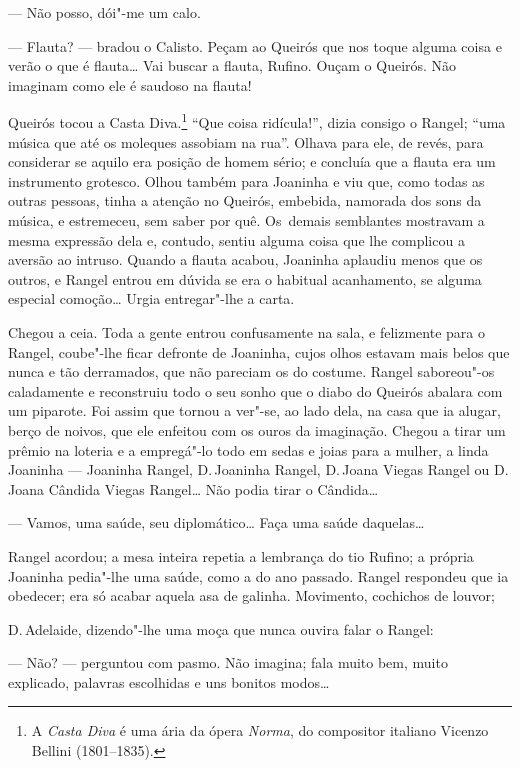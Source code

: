 \begin{linenumbers}
--- Não posso, dói"-me um calo.

--- Flauta? --- bradou o Calisto. Peçam ao Queirós que nos toque alguma
coisa e verão o que é flauta\ldots{} Vai buscar a flauta, Rufino. Ouçam o
Queirós. Não imaginam como ele é saudoso na flauta!

Queirós tocou a Casta Diva.\footnote{A \emph{Casta Diva} é uma ária da
  ópera \emph{Norma}, do compositor italiano Vicenzo Bellini
  (1801--1835).} ``Que coisa ridícula!'', dizia consigo o Rangel; ``uma
música que até os moleques assobiam na rua''. Olhava para ele, de revés,
para considerar se aquilo era posição de homem sério; e concluía que a
flauta era um instrumento grotesco. Olhou também para Joaninha e viu
que, como todas as outras pessoas, tinha a atenção no Queirós, embebida,
namorada dos sons da música, e estremeceu, sem saber por quê. Os~demais
semblantes mostravam a mesma expressão dela e, contudo, sentiu alguma
coisa que lhe complicou a aversão ao intruso. Quando a flauta acabou,
Joaninha aplaudiu menos que os outros, e Rangel entrou em dúvida se era
o habitual acanhamento, se alguma especial comoção\ldots{} Urgia entregar"-lhe
a carta.

Chegou a ceia. Toda a gente entrou confusamente na sala, e felizmente
para o Rangel, coube"-lhe ficar defronte de Joaninha, cujos olhos estavam
mais belos que nunca e tão derramados, que não pareciam os do costume.
Rangel saboreou"-os caladamente e reconstruiu todo o seu sonho que o
diabo do Queirós abalara com um piparote. Foi assim que tornou a ver"-se,
ao lado dela, na casa que ia alugar, berço de noivos, que ele enfeitou
com os ouros da imaginação. Chegou a tirar um prêmio na loteria e a
empregá"-lo todo em sedas e joias para a mulher, a linda Joaninha ---
Joaninha Rangel, D.\,Joaninha Rangel, D.\,Joana Viegas Rangel ou D.\,Joana
Cândida Viegas Rangel\ldots{} Não podia tirar o Cândida\ldots{}

--- Vamos, uma saúde, seu diplomático\ldots{} Faça uma saúde daquelas\ldots{}

Rangel acordou; a mesa inteira repetia a lembrança do tio Rufino; a
própria Joaninha pedia"-lhe uma saúde, como a do ano passado. Rangel
respondeu que ia obedecer; era só acabar aquela asa de galinha.
Movimento, cochichos de louvor;

D.\,Adelaide, dizendo"-lhe uma moça que nunca ouvira falar o Rangel:

--- Não? --- perguntou com pasmo. Não imagina; fala muito bem, muito
explicado, palavras escolhidas e uns bonitos modos\ldots{}


\end{linenumbers}
